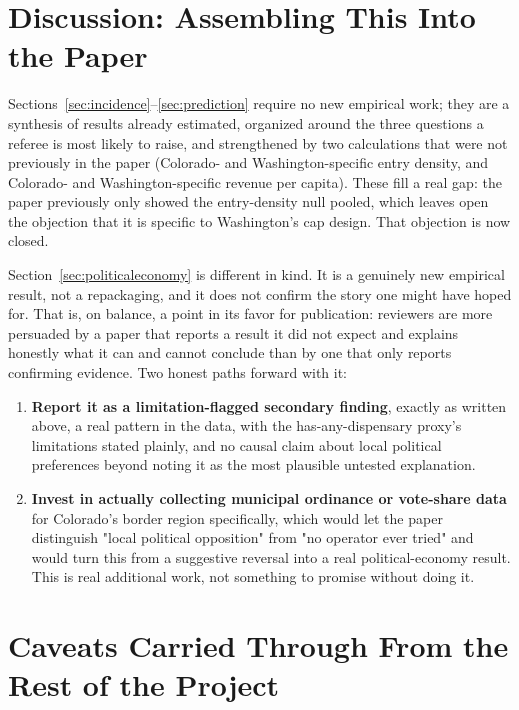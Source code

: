 \documentclass[11pt]{article}
\begin{document}
\section{Discussion: Assembling This Into the Paper}

Sections~\ref{sec:incidence}--\ref{sec:prediction} require no new empirical work; they are a synthesis of
results already estimated, organized around the three questions a referee is most likely to raise, and
strengthened by two calculations that were not previously in the paper (Colorado- and Washington-specific
entry density, and Colorado- and Washington-specific revenue per capita). These fill a real gap: the
paper previously only showed the entry-density null pooled, which leaves open the objection that it is
specific to Washington's cap design. That objection is now closed.

Section~\ref{sec:politicaleconomy} is different in kind. It is a genuinely new empirical result, not a
repackaging, and it does not confirm the story one might have hoped for. That is, on balance, a point in
its favor for publication: reviewers are more persuaded by a paper that reports a result it did not
expect and explains honestly what it can and cannot conclude than by one that only reports confirming
evidence. Two honest paths forward with it:

\begin{enumerate}
\item \textbf{Report it as a limitation-flagged secondary finding}, exactly as written above, a real
pattern in the data, with the has-any-dispensary proxy's limitations stated plainly, and no causal claim
about local political preferences beyond noting it as the most plausible untested explanation.
\item \textbf{Invest in actually collecting municipal ordinance or vote-share data} for Colorado's border
region specifically, which would let the paper distinguish "local political opposition" from "no operator
ever tried" and would turn this from a suggestive reversal into a real political-economy result. This is
real additional work, not something to promise without doing it.
\end{enumerate}

\section{Caveats Carried Through From the Rest of the Project}
\end{document}
